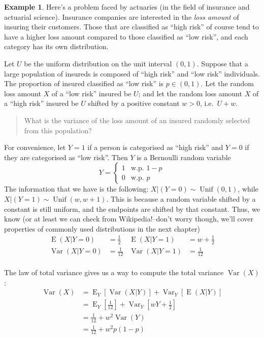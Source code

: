 \documentclass[
]{book}
\DeclareMathOperator{\E}{E}
\DeclareMathOperator{\Var}{Var}
\DeclareMathOperator{\Unif}{Unif}
\theoremstyle{definition}
\theoremstyle{definition}
\newtheorem{example}{Example}[chapter]
\theoremstyle{definition}
\theoremstyle{definition}
\theoremstyle{remark}
\begin{document}
\begin{example}
Here's a problem faced by actuaries (in the field of insurance and actuarial science).
Insurance companies are interested in the \emph{loss amount} of insuring their customers.
Those that are classified as ``high risk'' of course tend to have a higher loss amount compared to those classified as ``low risk'', and each category has its own distribution.

Let \(U\) be the uniform distribution on the unit interval \((0,1)\).
Suppose that a large population of insureds is composed of ``high risk'' and ``low risk'' individuals.
The proportion of insured classified as ``low risk'' is \(p\in(0,1)\).
Let the random loss amount \(X\) of a ``low risk'' insured be \(U\); and let the random loss amount \(X\) of a ``high risk'' insured be \(U\) shifted by a positive constant \(w>0\), i.e.~\(U+w\).

\begin{quote}
What is the variance of the loss amount of an insured randomly selected from this population?
\end{quote}

For convenience, let \(Y=1\) if a person is categorised as ``high risk'' and \(Y=0\) if they are categorised as ``low risk''.
Then \(Y\) is a Bernoulli random variable
\[
Y = \begin{cases}
1 & \text{w.p. } 1-p \\
0 & \text{w.p. } p
\end{cases}
\]
The information that we have is the following: \(X|(Y=0)\sim \Unif(0,1)\), while \(X|(Y=1)\sim \Unif(w,w+1)\).
This is because a random variable shifted by a constant is still uniform, and the endpoints are shifted by that constant.
Thus, we know (or at least we can check from Wikipedia!--don't worry though, we'll cover properties of commonly used distributions in the next chapter)
\begin{align*}
\E(X|Y=0)   &= \frac{1}{2}  &     \E(X|Y=1) &= w + \frac{1}{2} \\
\Var(X|Y=0) &= \frac{1}{12} &   \Var(X|Y=1) &= \frac{1}{12} \\
\end{align*}

The law of total variance gives us a way to compute the total variance \(\Var(X)\):
\begin{align*}
\Var(X)
&= \E_Y\left[ \Var(X|Y) \right] + \Var_Y\left[\E(X|Y) \right] \\
&= \E_Y \left[ \frac{1}{12}\right ] + \Var_Y \left[  wY + \frac{1}{2} \right] \\
&= \frac{1}{12} + w^2 \Var(Y) \\
&= \frac{1}{12} + w^2p(1-p)
\end{align*}


\end{example}
\end{document}
